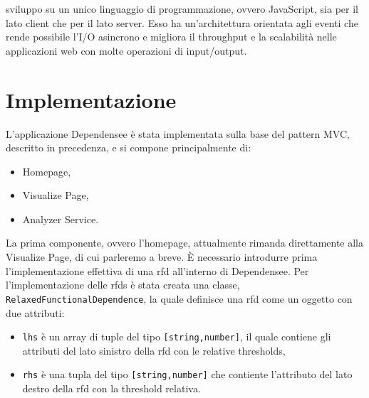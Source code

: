 sviluppo su un unico linguaggio di programmazione, ovvero JavaScript, sia per il lato client che per il lato server. Esso ha un'architettura orientata agli eventi che rende possibile l'I/O asincrono e migliora il throughput e la scalabilit\`{a} nelle applicazioni web con molte operazioni di input/output.

\section{Implementazione}
L'applicazione Dependensee \`{e} stata implementata sulla base del pattern MVC, descritto in precedenza, e si compone principalmente di:
\begin{itemize}
    \item Homepage,
    \item Visualize Page,
    \item Analyzer Service.
\end{itemize}
La prima componente, ovvero l'homepage, attualmente rimanda direttamente alla Visualize Page, di cui parleremo a breve. \`{E} necessario introdurre prima l'implementazione effettiva di una \acrlong{rfd} all'interno di Dependensee. Per l'implementazione delle \acrshort{rfds} \`{e} stata creata una classe, \texttt{RelaxedFunctionalDependence}, la quale definisce una \acrshort{rfd} come un oggetto con due attributi:
\begin{itemize}
    \item \texttt{lhs} \`{e} un array di tuple del tipo \texttt{[string,number]}, il quale contiene gli attributi del lato sinistro della \acrshort{rfd} con le relative thresholds,
    \item \texttt{rhs} \`{e} una tupla del tipo \texttt{[string,number]} che contiente l'attributo del lato destro della \acrshort{rfd} con la threshold relativa.
\end{itemize}
